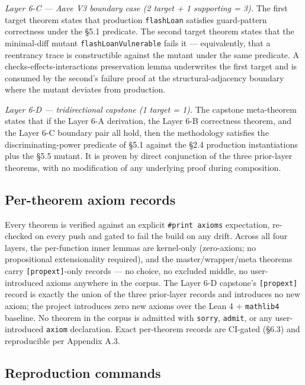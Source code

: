\emph{Layer 6-C --- Aave V3 boundary case (2 target + 1 supporting =
3).} The first target theorem states that production \texttt{flashLoan}
satisfies guard-pattern correctness under the §5.1 predicate. The second
target theorem states that the minimal-diff mutant
\texttt{flashLoanVulnerable} fails it --- equivalently, that a
reentrancy trace is constructible against the mutant under the same
predicate. A checks-effects-interactions preservation lemma underwrites
the first target and is consumed by the second's failure proof at the
structural-adjacency boundary where the mutant deviates from production.

\emph{Layer 6-D --- tridirectional capstone (1 target = 1).} The
capstone meta-theorem states that if the Layer 6-A derivation, the Layer
6-B correctness theorem, and the Layer 6-C boundary pair all hold, then
the methodology satisfies the discriminating-power predicate of §5.1
against the §2.4 production instantiations plus the §5.5 mutant. It is
proven by direct conjunction of the three prior-layer theorems, with no
modification of any underlying proof during composition.

\subsection{Per-theorem axiom records}\label{per-theorem-axiom-records}

Every theorem is verified against an explicit \texttt{\#print\ axioms}
expectation, re-checked on every push and gated to fail the build on any
drift. Across all four layers, the per-function inner lemmas are
kernel-only (zero-axiom; no propositional extensionality required), and
the master/wrapper/meta theorems carry \texttt{{[}propext{]}}-only
records --- no choice, no excluded middle, no user-introduced axioms
anywhere in the corpus. The Layer 6-D capstone's \texttt{{[}propext{]}}
record is exactly the union of the three prior-layer records and
introduces no new axiom; the project introduces zero new axioms over the
Lean 4 + \texttt{mathlib4} baseline. No theorem in the corpus is
admitted with \texttt{sorry}, \texttt{admit}, or any user-introduced
\texttt{axiom} declaration. Exact per-theorem records are CI-gated
(§6.3) and reproducible per Appendix A.3.

\subsection{Reproduction commands}\label{reproduction-commands}

